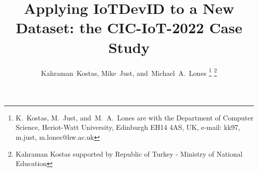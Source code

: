 \documentclass[journal]{IEEEtran}
\begin{document}
%
\title{Applying IoTDevID to a New Dataset: the CIC-IoT-2022 Case Study}

\author{Kahraman~Kostas,
	Mike~Just,
	and~Michael~A.~Lones%
\thanks{K.~Kostas, M.~Just,	and~M.~A.~Lones  are with the Department of Computer Science, Heriot-Watt University, Edinburgh EH14 4AS, UK,  e-mail: kk97, m.just, m.lones@hw.ac.uk}
\thanks{Kahraman Kostas supported by Republic of Turkey - Ministry of National Education}}%

% 
%



% 
\end{document}
